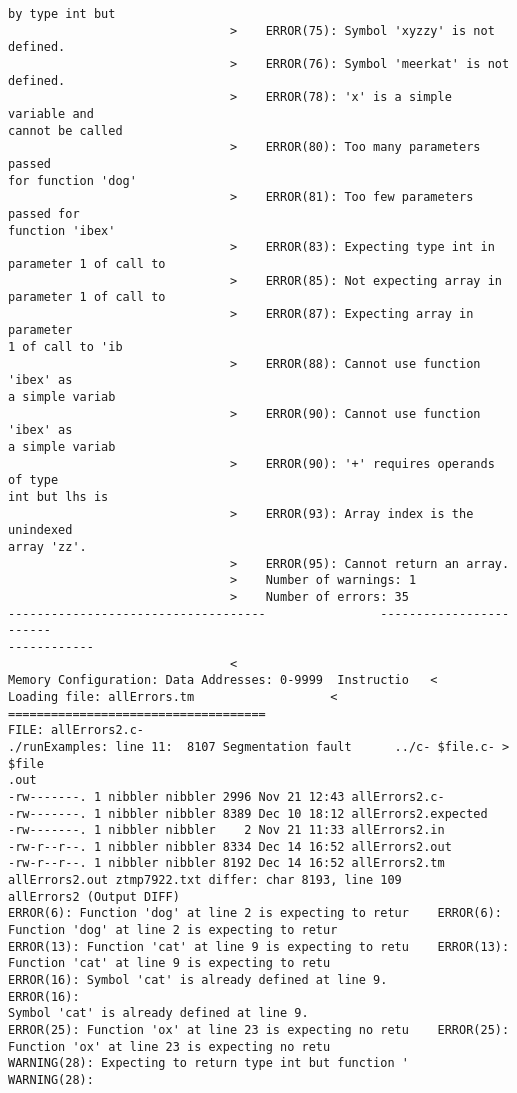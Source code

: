 \documentclass[12pt]{book}
\begin{document}
\begin{lstlisting}
by type int but 
                               >    ERROR(75): Symbol 'xyzzy' is not defined.
                               >    ERROR(76): Symbol 'meerkat' is not 
defined.
                               >    ERROR(78): 'x' is a simple variable and 
cannot be called
                               >    ERROR(80): Too many parameters passed 
for function 'dog'
                               >    ERROR(81): Too few parameters passed for
function 'ibex'
                               >    ERROR(83): Expecting type int in 
parameter 1 of call to 
                               >    ERROR(85): Not expecting array in 
parameter 1 of call to
                               >    ERROR(87): Expecting array in parameter 
1 of call to 'ib
                               >    ERROR(88): Cannot use function 'ibex' as
a simple variab
                               >    ERROR(90): Cannot use function 'ibex' as
a simple variab
                               >    ERROR(90): '+' requires operands of type
int but lhs is 
                               >    ERROR(93): Array index is the unindexed 
array 'zz'.
                               >    ERROR(95): Cannot return an array.
                               >    Number of warnings: 1
                               >    Number of errors: 35
------------------------------------                ------------------------
------------
                               <
Memory Configuration: Data Addresses: 0-9999  Instructio   <
Loading file: allErrors.tm                   <
====================================
FILE: allErrors2.c-
./runExamples: line 11:  8107 Segmentation fault      ../c- $file.c- > $file
.out
-rw-------. 1 nibbler nibbler 2996 Nov 21 12:43 allErrors2.c-
-rw-------. 1 nibbler nibbler 8389 Dec 10 18:12 allErrors2.expected
-rw-------. 1 nibbler nibbler    2 Nov 21 11:33 allErrors2.in
-rw-r--r--. 1 nibbler nibbler 8334 Dec 14 16:52 allErrors2.out
-rw-r--r--. 1 nibbler nibbler 8192 Dec 14 16:52 allErrors2.tm
allErrors2.out ztmp7922.txt differ: char 8193, line 109
allErrors2 (Output DIFF)
ERROR(6): Function 'dog' at line 2 is expecting to retur    ERROR(6): 
Function 'dog' at line 2 is expecting to retur
ERROR(13): Function 'cat' at line 9 is expecting to retu    ERROR(13): 
Function 'cat' at line 9 is expecting to retu
ERROR(16): Symbol 'cat' is already defined at line 9.        ERROR(16): 
Symbol 'cat' is already defined at line 9.
ERROR(25): Function 'ox' at line 23 is expecting no retu    ERROR(25): 
Function 'ox' at line 23 is expecting no retu
WARNING(28): Expecting to return type int but function '    WARNING(28): 

\end{lstlisting}
\end{document}
